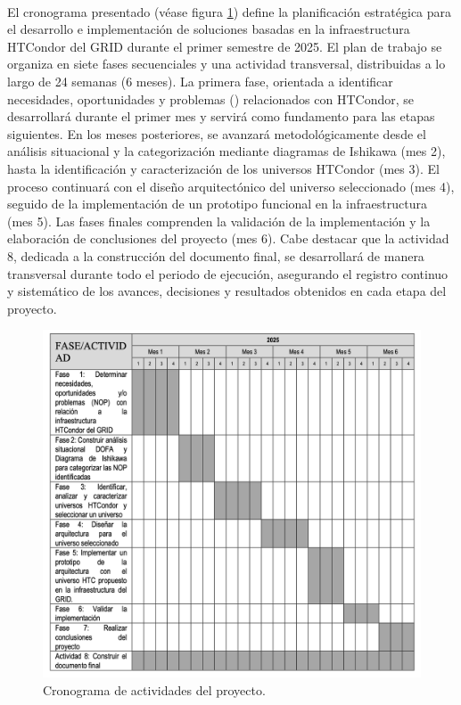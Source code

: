 \label{cap:cronograma}
\mbox{}\\
\noindent

El cronograma presentado (véase figura \ref{fig:cronograma}) define la planificación estratégica para el desarrollo e implementación de soluciones basadas en la infraestructura HTCondor del GRID durante el primer semestre de 2025. El plan de trabajo se organiza en siete fases secuenciales y una actividad transversal, distribuidas a lo largo de 24 semanas (6 meses). La primera fase, orientada a identificar necesidades, oportunidades y problemas (\NPO) relacionados con HTCondor, se desarrollará durante el primer mes y servirá como fundamento para las etapas siguientes. En los meses posteriores, se avanzará metodológicamente desde el análisis situacional \DOFA y la categorización mediante diagramas de Ishikawa (mes 2), hasta la identificación y caracterización de los universos HTCondor (mes 3). El proceso continuará con el diseño arquitectónico del universo seleccionado (mes 4), seguido de la implementación de un prototipo funcional en la infraestructura \GRID (mes 5). Las fases finales comprenden la validación de la implementación y la elaboración de conclusiones del proyecto (mes 6). Cabe destacar que la actividad 8, dedicada a la construcción del documento final, se desarrollará de manera transversal durante todo el periodo de ejecución, asegurando el registro continuo y sistemático de los avances, decisiones y resultados obtenidos en cada etapa del proyecto.

\begin{figure}[H]
	\centering
	\includegraphics[scale=0.5]{tablas-images/partes/01-generalidades/cronograma.png}
	\caption{Cronograma de actividades del proyecto.}\label{fig:cronograma}
\end{figure}
